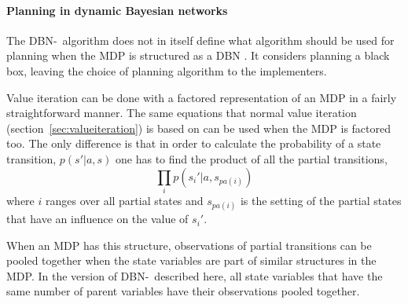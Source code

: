 \paragraph{Planning in dynamic Bayesian networks}

The DBN-\etre\ algorithm does not in itself define what algorithm should be
used for planning when the MDP is structured as a DBN
\parencite{kearns1999efficient}. It considers planning a black box, leaving the
choice of planning algorithm to the implementers. 

Value iteration can be done with a factored representation of an MDP in a fairly straightforward manner. The same equations that normal value iteration (section~\ref{sec:valueiteration}) is based on can be used when the MDP is factored too. The only difference is that in order to calculate the probability of a state transition, $p(s'| a, s)$ one has to find the product of all the partial transitions,
\begin{equation}
\prod\limits _{i} p(s_i' | a, s_{pa(i)})
\end{equation}
where $i$ ranges over all partial states and $s_{pa(i)}$ is the setting of the partial states that have an influence on the value of $s_i'$. 

When an MDP has this structure, observations of partial transitions can be pooled together when the state variables are part of similar structures in the MDP. In the version of DBN-\etre\ described here, all state variables that have the same number of parent variables have their observations pooled together. 
